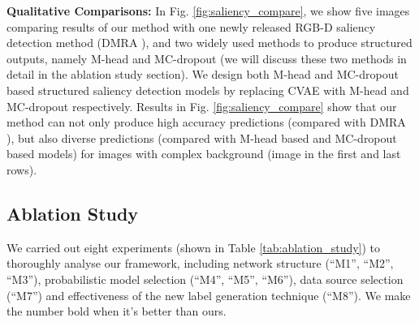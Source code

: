 \documentclass[10pt,twocolumn,letterpaper]{article}
\begin{document}
\noindent\textbf{Qualitative Comparisons:}
In Fig. \ref{fig:saliency_compare}, we show five images comparing results of our method with one newly released RGB-D saliency detection method (DMRA \cite{dmra_iccv19}), and two widely used methods to produce structured outputs, namely M-head \cite{Rupprecht2016LearningIA} and MC-dropout \cite{kendall2015bayesian} (we will discuss these two methods in detail in the ablation study section). We design both M-head and MC-dropout based structured saliency detection models by replacing CVAE with M-head and MC-dropout respectively. 
Results in Fig. \ref{fig:saliency_compare} show that our method can not only produce high accuracy predictions (compared with DMRA \cite{dmra_iccv19}), but also diverse predictions (compared with M-head based and MC-dropout based models) for images with complex background (image in the first and last rows).







\subsection{Ablation Study}\label{sec:AblationStudy}
We carried out eight experiments (shown in Table \ref{tab:ablation_study}) to thoroughly analyse our framework, including network structure (\enquote{M1}, \enquote{M2}, \enquote{M3}), probabilistic model selection (\enquote{M4}, \enquote{M5}, \enquote{M6}), data source selection (\enquote{M7}) and effectiveness of the new label generation technique (\enquote{M8}).
We make the number bold
when it's better than ours.
\end{document}
